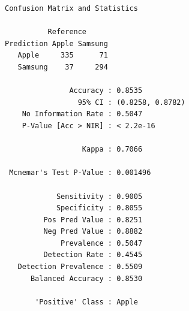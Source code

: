 \begin{Shaded}
\begin{Highlighting}[]

\OtherTok{\textless{}{-}} \SpecialCharTok{\textasciitilde{}} \NormalTok{, } \NormalTok{)}

\OtherTok{\textless{}{-}} 

\SpecialCharTok{$}
\end{Highlighting}
\end{Shaded}

\begin{verbatim}
Confusion Matrix and Statistics

          Reference
Prediction Apple Samsung
   Apple     335      71
   Samsung    37     294
                                          
               Accuracy : 0.8535          
                 95% CI : (0.8258, 0.8782)
    No Information Rate : 0.5047          
    P-Value [Acc > NIR] : < 2.2e-16       
                                          
                  Kappa : 0.7066          
                                          
 Mcnemar's Test P-Value : 0.001496        
                                          
            Sensitivity : 0.9005          
            Specificity : 0.8055          
         Pos Pred Value : 0.8251          
         Neg Pred Value : 0.8882          
             Prevalence : 0.5047          
         Detection Rate : 0.4545          
   Detection Prevalence : 0.5509          
      Balanced Accuracy : 0.8530          
                                          
       'Positive' Class : Apple           
                                          
\end{verbatim}

